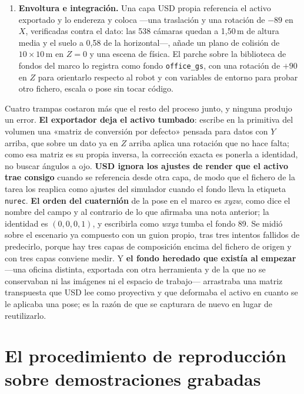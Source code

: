 \begin{enumerate}
	\item \textbf{Envoltura e integración.} Una capa USD propia referencia el activo exportado y lo
	endereza y coloca —una traslación y una rotación de $-89$\textdegree{} en $X$, verificadas
	contra el dato: las 538 cámaras quedan a 1,50\,m de altura media y el suelo a 0,58\textdegree{}
	de la horizontal—, añade un plano de colisión de $10 \times 10$\,m en $Z = 0$ y una escena de
	física. El parche sobre la biblioteca de fondos del marco lo registra como fondo
	\texttt{office\_gs}, con una rotación de $+90$\textdegree{} en $Z$ para orientarlo respecto al
	robot y con variables de entorno para probar otro fichero, escala o pose sin tocar código.
\end{enumerate}

Cuatro trampas costaron más que el resto del proceso junto, y ninguna produjo un error.
\textbf{El exportador deja el activo tumbado}: escribe en la primitiva del volumen una «matriz de
conversión por defecto» pensada para datos con $Y$ arriba, que sobre un dato ya en $Z$ arriba
aplica una rotación que no hace falta; como esa matriz es su propia inversa, la corrección exacta
es ponerla a identidad, no buscar ángulos a ojo. \textbf{USD ignora los ajustes de render que el
activo trae consigo} cuando se referencia desde otra capa, de modo que el fichero de la tarea los
reaplica como ajustes del simulador cuando el fondo lleva la etiqueta \texttt{nurec}. \textbf{El
orden del cuaternión} de la pose en el marco es \textit{xyzw}, como dice el nombre del campo y al
contrario de lo que afirmaba una nota anterior; la identidad es $(0,0,0,1)$, y escribirla como
\textit{wxyz} tumba el fondo 89\textdegree. Se midió sobre el escenario ya compuesto con un guion
propio, tras tres intentos fallidos de predecirlo, porque hay tres capas de composición encima del
fichero de origen y con tres capas conviene medir. Y \textbf{el fondo heredado que existía al
empezar} —una oficina distinta, exportada con otra herramienta y de la que no se conservaban ni
las imágenes ni el espacio de trabajo— arrastraba una matriz transpuesta que USD lee como
proyectiva y que deformaba el activo en cuanto se le aplicaba una pose; es la razón de que se
capturara de nuevo en lugar de reutilizarlo.

\section{El procedimiento de reproducción sobre demostraciones grabadas}

